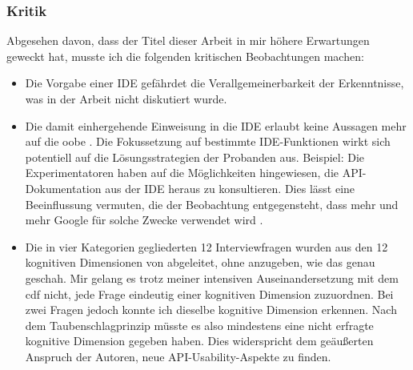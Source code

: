 \subsubsection{Kritik}
\begin{important}
Abgesehen davon, dass der Titel dieser Arbeit in mir höhere Erwartungen geweckt hat, musste ich die folgenden kritischen Beobachtungen machen:
\begin{itemize}
  \item Die Vorgabe einer IDE gefährdet die Verallgemeinerbarkeit der Erkenntnisse, was in der Arbeit nicht diskutiert wurde.
  \item Die damit einhergehende Einweisung in die IDE erlaubt keine Aussagen mehr auf die \gls{oobe} \citep{Kahlert:2011wr}. Die Fokussetzung auf bestimmte IDE-Funktionen wirkt sich potentiell auf die Lösungsstrategien der Probanden aus. Beispiel: Die Experimentatoren haben auf die Möglichkeiten hingewiesen, die API-Dokumentation aus der IDE heraus zu konsultieren. Dies lässt eine Beeinflussung vermuten, die der Beobachtung entgegensteht, dass mehr und mehr Google für solche Zwecke verwendet wird \citep{Stylos:2009ts}.
  \item Die in vier Kategorien gegliederten 12 Interviewfragen wurden aus den 12 kognitiven Dimensionen von \cite{Anonymous:9HSMlhmF} abgeleitet, ohne anzugeben, wie das genau geschah. Mir gelang es trotz meiner intensiven Auseinandersetzung mit dem \gls{cdf} nicht, jede Frage eindeutig einer kognitiven Dimension zuzuordnen. Bei zwei Fragen jedoch konnte ich dieselbe kognitive Dimension erkennen. Nach dem Taubenschlagprinzip müsste es also mindestens eine nicht erfragte kognitive Dimension gegeben haben. Dies widerspricht dem geäußerten Anspruch der Autoren, neue API-Usability-Aspekte zu finden.
\end{itemize}
\end{important}